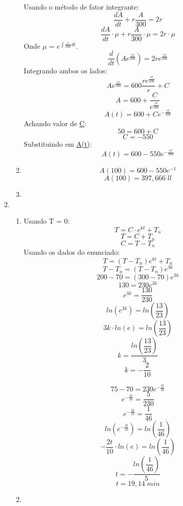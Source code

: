 \documentclass[a4paper, 12pt]{article}
\begin{document}
\begin{enumerate}
\begin{enumerate}
					Usando o método de fator integrante:
					$$\dfrac{dA}{dt}+ r\dfrac{A}{300} = 2r$$
					$$\dfrac{dA}{dt}\cdot\mu+ r\dfrac{A}{300}\cdot\mu = 2r\cdot\mu$$
					Onde $\mu$ = $\textit{e}^{\int \frac{r}{300}dt}$.
					$$\dfrac{d}{dt}(A\textit{e}^{\frac{rt}{300}}) = 2r\textit{e}^{\frac{rt}{300}}$$
					Integrando ambos os lados:
					$$A\textit{e}^{\frac{rt}{300}} = 600\dfrac{r\textit{e}^{\frac{rt}{300}}}{r}+C$$
					$$A = 600 + \dfrac{C}{\textit{e}^{\frac{rt}{300}}}$$
					$$A(t) = 600 + C\textit{e}^{-\frac{rt}{300}}$$
					Achando valor de \underline{C}:
					$$50 = 600 + C$$
					$$C = -550$$
					Substituindo em \underline{A(t)}:
					$$A(t) = 600 - 550\textit{e}^{-\frac{rt}{300}}$$
				\item
					$$A(100) = 600 - 550\textit{e}^{-1}$$
					$$A(100) = 397,666\;ll$$
				\item
			\end{enumerate}
		\item
			\begin{enumerate}
				\item
					Usando T = 0:
					$$T = C\cdot\textit{e}^{kt} + T_n$$
					$$T = C + T_n$$
					$$C = T - T_n$$
					Usando os dados do enunciado:
					$$T = (T - T_n)\textit{e}^{kt} + T_n$$
					$$T - T_n= (T - T_n)\textit{e}^{3k}$$
					$$200 - 70 = (300 - 70)\textit{e}^{3k}$$
					$$130 = 230\textit{e}^{3k}$$
					$$\textit{e}^{3k} = \dfrac{130}{230}$$
					$$ln(\textit{e}^{3k}) = ln(\dfrac{13}{23})$$
					$$3k\cdot ln(\textit{e}) = ln(\dfrac{13}{23})$$
					$$k = \dfrac{ln(\dfrac{13}{23})}{3}$$
					$$k = -\dfrac{2}{10}$$
					
					$$75 - 70 = 230\textit{e}^{-\frac{2t}{10}}$$
					$$\textit{e}^{-\frac{2t}{10}} = \dfrac{5}{230}$$
					$$\textit{e}^{-\frac{2t}{10}} = \dfrac{1}{46}$$
					$$ln(\textit{e}^{-\frac{2t}{10}}) = ln(\dfrac{1}{46})$$
					$$-\dfrac{2t}{10}\cdot ln(\textit{e}) = ln(\dfrac{1}{46})$$
					$$t = -\dfrac{ln(\dfrac{1}{46})}{5}$$
					$$t = 19,14 \;min$$
				\item
			\end{enumerate}
	\end{enumerate}
\end{document}

